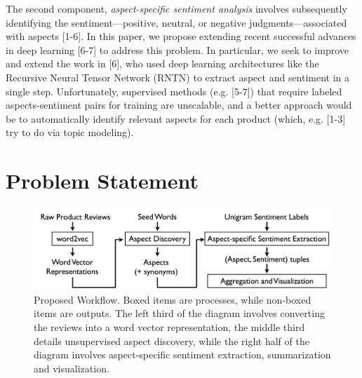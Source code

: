 \documentclass{article} %
\begin{document}
The second component, \textit{aspect-specific sentiment analysis} involves subsequently identifying the sentiment---positive, neutral, or negative judgments---associated with aspects [1-6]. In this paper, we propose extending recent successful advances in deep learning [6-7] to address this problem. In particular, we seek to improve and extend the work in [6], who used deep learning architectures like the Recursive Neural Tensor Network (RNTN) to extract aspect and sentiment in a single step. Unfortunately, supervised methods (e.g. [5-7]) that require labeled aspects-sentiment pairs for training are unscalable, and a better approach would be to automatically identify relevant aspects for each product (which, e.g. [1-3] try to do via topic modeling). 











\section{Problem Statement}

\begin{figure}[h]
\begin{center}
\includegraphics[width=.85\columnwidth]{workflow.png}
\end{center}
\caption{Proposed Workflow. Boxed items are processes, while non-boxed items are outputs. The left third of the diagram involves converting the reviews into a word vector representation, the middle third details unsupervised aspect discovery, while the right half of the diagram involves aspect-specific sentiment extraction, summarization and visualization.}%
\label{workflow}
\end{figure}
\end{document}
